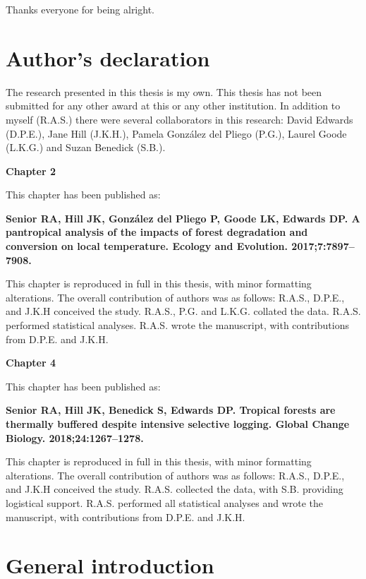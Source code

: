 \documentclass[12pt,a4paper,]{report}
\theoremstyle{definition}
\theoremstyle{definition}
\theoremstyle{definition}
\theoremstyle{remark}
\begin{document}
Thanks everyone for being alright.

\pagebreak

\chapter*{Author's declaration}\label{authors-declaration}

The research presented in this thesis is my own. This thesis has not
been submitted for any other award at this or any other institution. In
addition to myself (R.A.S.) there were several collaborators in this
research: David Edwards (D.P.E.), Jane Hill (J.K.H.), Pamela González
del Pliego (P.G.), Laurel Goode (L.K.G.) and Suzan Benedick (S.B.).

\textbf{Chapter 2}

This chapter has been published as:

\textbf{Senior RA, Hill JK, González del Pliego P, Goode LK, Edwards DP.
A pantropical analysis of the impacts of forest degradation and
conversion on local temperature. Ecology and Evolution.
2017;7:7897--7908.}

This chapter is reproduced in full in this thesis, with minor formatting
alterations. The overall contribution of authors was as follows: R.A.S.,
D.P.E., and J.K.H conceived the study. R.A.S., P.G. and L.K.G. collated
the data. R.A.S. performed statistical analyses. R.A.S. wrote the
manuscript, with contributions from D.P.E. and J.K.H.

\textbf{Chapter 4}

This chapter has been published as:

\textbf{Senior RA, Hill JK, Benedick S, Edwards DP. Tropical forests are
thermally buffered despite intensive selective logging. Global Change
Biology. 2018;24:1267--1278.}

This chapter is reproduced in full in this thesis, with minor formatting
alterations. The overall contribution of authors was as follows: R.A.S.,
D.P.E., and J.K.H conceived the study. R.A.S. collected the data, with
S.B. providing logistical support. R.A.S. performed all statistical
analyses and wrote the manuscript, with contributions from D.P.E. and
J.K.H.

\pagebreak

\pagestyle{fancyplain} \fancyhf{}
\fancyhead[R]{\nouppercase\chaptername \space \thechapter}
\fancyfoot[R]{\thepage} 

\chapter{General introduction}\label{general-introduction}
\end{document}
